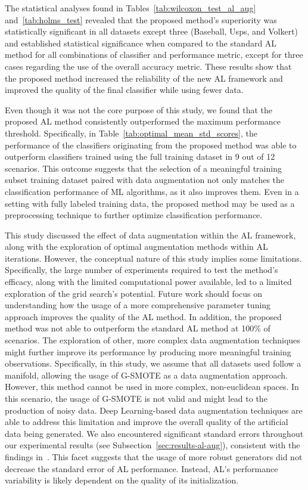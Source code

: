 The statistical analyses found in Tables~\ref{tab:wilcoxon_test_al_aug}
and~\ref{tab:holms_test} revealed that the proposed method's superiority was
statistically significant in all datasets except three (Baseball, Usps, and
Volkert) and established statistical significance when compared to the
standard AL method for all combinations of classifier and performance metric,
except for three cases regarding the use of the overall accuracy metric. These
results show that the proposed method increased the reliability of the new AL
framework and improved the quality of the final classifier while using fewer
data.

Even though it was not the core purpose of this study, we found that the
proposed AL method consistently outperformed the maximum performance
threshold. Specifically, in Table~\ref{tab:optimal_mean_std_scores}, the
performance of the classifiers originating from the proposed method was able
to outperform classifiers trained using the full training dataset in 9 out of
12 scenarios. This outcome suggests that the selection of a meaningful
training subset training dataset paired with data augmentation not only
matches the classification performance of ML algorithms, as it also improves
them. Even in a setting with fully labeled training data, the proposed method
may be used as a preprocessing technique to further optimize classification
performance.

This study discussed the effect of data augmentation within the AL framework,
along with the exploration of optimal augmentation methods within AL
iterations. However, the conceptual nature of this study implies some
limitations. Specifically, the large number of experiments required to
test the method's efficacy, along with the limited computational power
available, led to a limited exploration of the grid search's potential. Future
work should focus on understanding how the usage of a more comprehensive
parameter tuning approach improves the quality of the AL method. In addition,
the proposed method was not able to outperform the standard AL method at
100\% of scenarios. The exploration of other, more complex data augmentation
techniques might further improve its performance by producing more
meaningful training observations. Specifically, in this study, we assume
that all datasets used follow a manifold, allowing the usage of G-SMOTE as a
data augmentation approach. However, this method cannot be used in more
complex, non-euclidean spaces. In this scenario, the usage of G-SMOTE is not
valid and might lead to the production of noisy data. Deep Learning-based data
augmentation techniques are able to address this limitation and improve the
overall quality of the artificial data being generated. We also
encountered significant standard errors throughout our experimental
results (see Subsection~\ref{sec:results-al-aug}), consistent with the findings
in~\cite{Fonseca2021al, Kottke2017}. This facet suggests that the usage of
more robust generators did not decrease the standard error of AL performance.
Instead, AL's performance variability is likely dependent on the quality of
its initialization.

